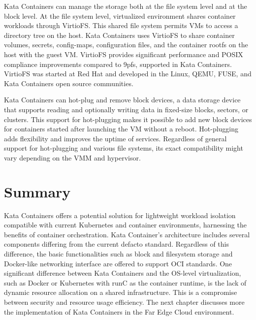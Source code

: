 Kata Containers can manage the storage both at the file system level and at the block level. At the file system level, virtualized environment shares container workloads through VirtioFS. This shared file system permits VMs to access a directory tree on the host. Kata Containers uses VirtioFS to share container volumes, secrets, config-maps, configuration files, and the container rootfs on the host with the guest VM. VirtioFS provides significant performance and POSIX compliance improvements compared to 9pfs, supported in Kata Containers. VirtioFS was started at Red Hat and developed in the Linux, QEMU, FUSE, and Kata Containers open source communities. \cite{virtio-fs-Kata}\cite{virtio-fs}

Kata Containers can hot-plug and remove block devices, a data storage device that supports reading and optionally writing data in fixed-size blocks, sectors, or clusters. This support for hot-plugging makes it possible to add new block devices for containers started after launching the VM without a reboot. Hot-plugging adds flexibility and improves the uptime of services. Regardless of general support for hot-plugging and various file systems, its exact compatibility might vary depending on the VMM and hypervisor. \cite{KataContainersArchitecture}\cite{KataContainersVirtualization}

\section{Summary}

Kata Containers offers a potential solution for lightweight workload isolation compatible with current Kubernetes and container environments, harnessing the benefits of container orchestration. Kata Container's architecture includes several components differing from the current defacto standard. Regardless of this difference, the basic functionalities such as block and filesystem storage and Docker-like networking interface are offered to support OCI standards. One significant difference between Kata Containers and the OS-level virtualization, such as Docker or Kubernetes with runC as the container runtime, is the lack of dynamic resource allocation on a shared infrastructure. This is a compromise between security and resource usage efficiency. The next chapter discusses more the implementation of Kata Containers in the Far Edge Cloud environment.